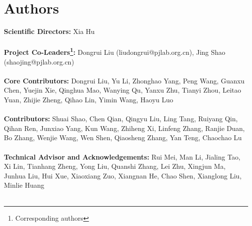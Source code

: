 



\section{Authors}

\textbf{Scientific Directors:} Xia Hu\\
~\\
\textbf{Project Co-Leaders\footnote{Corresponding authors}:} Dongrui Liu (liudongrui@pjlab.org.cn), Jing Shao (shaojing@pjlab.org.cn)\\
~\\
 \textbf{Core Contributors:} Dongrui Liu, Yu Li, Zhonghao Yang, Peng Wang, Guanxu Chen, Yuejin Xie, Qinghua Mao, Wanying Qu, Yanxu Zhu, Tianyi Zhou, Leitao Yuan, Zhijie Zheng, Qihao Lin, Yimin Wang, Haoyu Luo\\
~\\
\textbf{Contributors:} Shuai Shao, Chen Qian, Qingyu Liu, Ling Tang, Ruiyang Qin, Qihan Ren, Junxiao Yang, Kun Wang, Zhiheng Xi, Linfeng Zhang, Ranjie Duan, Bo Zhang, Wenjie Wang, Wen Shen, Qiaosheng Zhang, Yan Teng, Chaochao Lu \\
~\\
\textbf{Technical Advisor and Acknowledgements:} Rui Mei, Man Li, Jialing Tao, Xi Lin, Tianhang Zheng, Yong Liu, Quanshi Zhang, Lei Zhu, Xingjun Ma, Junhua Liu, Hui Xue, Xiaoxiang Zuo, Xiangnan He, Chao Shen, Xianglong Liu, Minlie Huang\\
~\\



\newpage